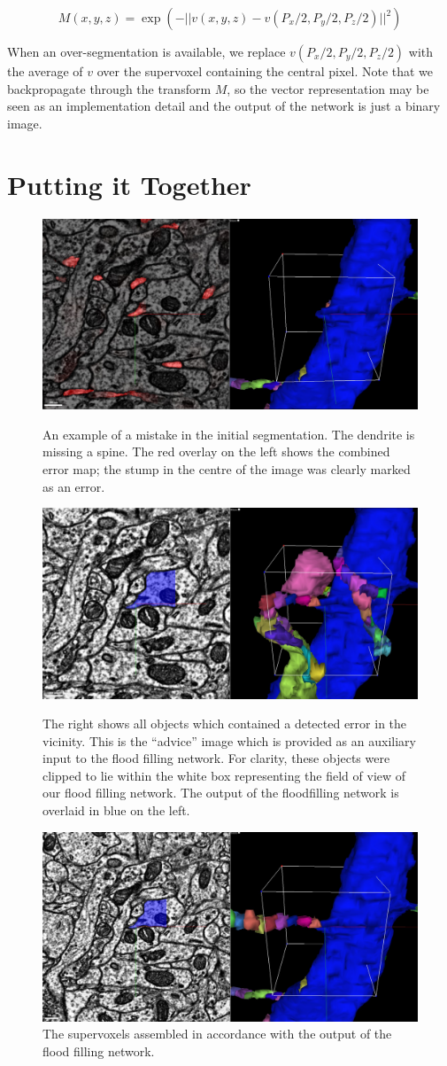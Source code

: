 \documentclass{article}
\begin{document}
\begin{equation*}
	M(x,y,z)=\exp(-||v(x,y,z)-v(P_x/2,P_y/2,P_z/2)||^2)
\end{equation*}

When an over-segmentation is available, we replace $v(P_x/2,P_y/2,P_z/2)$ with the average of $v$ over the supervoxel containing the central pixel. Note that we backpropagate through the transform $M$, so the vector representation may be seen as an implementation detail and the output of the network is just a binary image.


\section{Putting it Together}

\begin{figure}
\begin{center}
	\includegraphics[width=0.65\linewidth]{errors.jpg}
	\caption{An example of a mistake in the initial segmentation. The dendrite is missing a spine. The red overlay on the left shows the combined error map; the stump in the centre of the image was clearly marked as an error.}

	\includegraphics[width=0.65\linewidth]{neighbours.jpg}
	\caption{The right shows all objects which contained  a detected error in the vicinity. This is the ``advice'' image which is provided as an auxiliary input to the flood filling network. For clarity, these objects were clipped to lie within the white box representing the field of view of our flood filling network. The output of the floodfilling network is overlaid in blue on the left.}

	\includegraphics[width=0.65\linewidth]{final.jpg}
	\caption{The supervoxels assembled in accordance with the output of the flood filling network.}
\end{center}
\end{figure}
\end{document}
